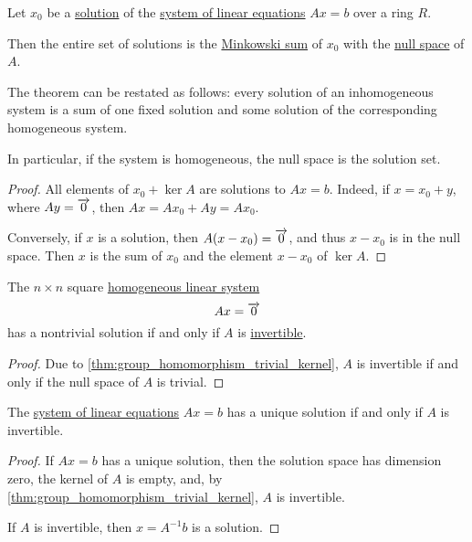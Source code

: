 \begin{proposition}\label{thm:linear_system_solutions}
  Let \( x_0 \) be a \hyperref[def:equation/solution]{solution} of the \hyperref[def:system_of_linear_equations]{system of linear equations} \( Ax = b \) over a ring \( R \).

  Then the entire set of solutions is the \hyperref[def:minkowski_sum]{Minkowski sum} of \( x_0 \) with the \hyperref[def:module/kernel]{null space} of \( A \).
\end{proposition}
\begin{comments}
  \item The theorem can be restated as follows: every solution of an inhomogeneous system is a sum of one fixed solution and some solution of the corresponding homogeneous system.

  \item In particular, if the system is homogeneous, the null space is the solution set.
\end{comments}
\begin{proof}
  All elements of \( x_0 + \ker A \) are solutions to \( Ax = b \). Indeed, if \( x = x_0 + y \), where \( Ay = \overrightarrow{0} \), then \( Ax = Ax_0 + Ay = Ax_0 \).

  Conversely, if \( x \) is a solution, then \( A(x - x_0) = \overrightarrow{0} \), and thus \( x - x_0 \) is in the null space. Then \( x \) is the sum of \( x_0 \) and the element \( x - x_0 \) of \( \ker A \).
\end{proof}

\begin{corollary}\label{thm:homogeneous_linear_equations_solutions}
  The \( n \times n \) square \hyperref[def:system_of_linear_equations/homogeneous]{homogeneous linear system}
  \begin{equation*}
    Ax = \overrightarrow{0}
  \end{equation*}
  has a nontrivial solution if and only if \( A \) is  \hyperref[def:inverse_matrix]{invertible}.
\end{corollary}
\begin{proof}
  Due to \cref{thm:group_homomorphism_trivial_kernel}, \( A \) is invertible if and only if the null space of \( A \) is trivial.
\end{proof}

\begin{corollary}\label{thm:system_of_equations_unique_solution}
  The \hyperref[def:system_of_linear_equations]{system of linear equations} \( Ax = b \) has a unique solution if and only if \( A \) is invertible.
\end{corollary}
\begin{proof}
  \SufficiencySubProof If \( Ax = b \) has a unique solution, then the solution space has dimension zero, the kernel of \( A \) is empty, and, by \cref{thm:group_homomorphism_trivial_kernel}, \( A \) is invertible.

  \NecessitySubProof If \( A \) is invertible, then \( x = A^{-1} b \) is a solution.
\end{proof}

